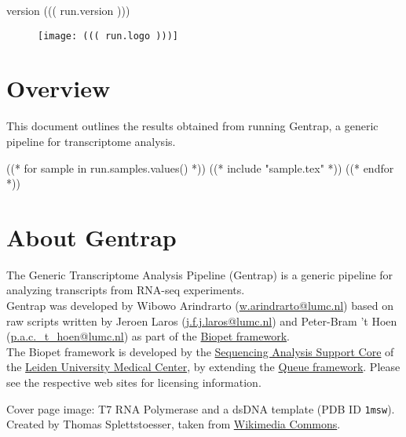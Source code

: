 \documentclass[a4paper,12pt]{article}
\begin{document}
\setlength{\parindent}{0in}
\title{}
\author{LUMC Sequencing Analysis Support Core}
\maketitle
\begin{center}
    {\LARGE version ((( run.version )))}
\end{center}
\begin{figure}[h!]
    \centering
    \texttt{[image: ((( run.logo )))]}
\end{figure}
\thispagestyle{empty}
\clearpage

\tableofcontents
\clearpage


\part{Overview}
\label{sec:intro}

This document outlines the results obtained from running Gentrap, a generic
pipeline for transcriptome analysis.

\clearpage

((* for sample in run.samples.values() *))
((* include "sample.tex" *))
\clearpage
((* endfor *))


\part{About Gentrap}
\label{apx:about}

The Generic Transcriptome Analysis Pipeline (Gentrap) is a
generic pipeline for analyzing transcripts from RNA-seq experiments. \\

Gentrap was developed by Wibowo Arindrarto (\href{mailto:w.arindrarto@lumc.nl}{w.arindrarto@lumc.nl})
based on raw scripts written by Jeroen Laros
(\href{mailto:j.f.j.laros@lumc.nl}{j.f.j.laros@lumc.nl}) and
Peter-Bram 't Hoen
(\href{mailto:p.a.c._t_hoen@lumc.nl}{p.a.c._t_hoen@lumc.nl}) as part of the
\href{https://git.lumc/nl/biopet/biopet}{Biopet framework}. \\

The Biopet framework is developed by the
\href{http://sasc.lumc.nl}{Sequencing Analysis Support Core} of the
\href{http://lumc.nl}{Leiden University Medical Center}, by extending the
\href{http://http://gatkforums.broadinstitute.org/discussion/1306/overview-of-queue}{Queue framework}.
Please see the respective web sites for licensing information.

\indent

Cover page image: T7 RNA Polymerase and a dsDNA template (PDB ID \texttt{1msw}).
Created by Thomas Splettstoesser, taken from
\href{http://commons.wikimedia.org/wiki/File:T7_RNA_polymerase.jpg}{Wikimedia Commons}.
\end{document}
